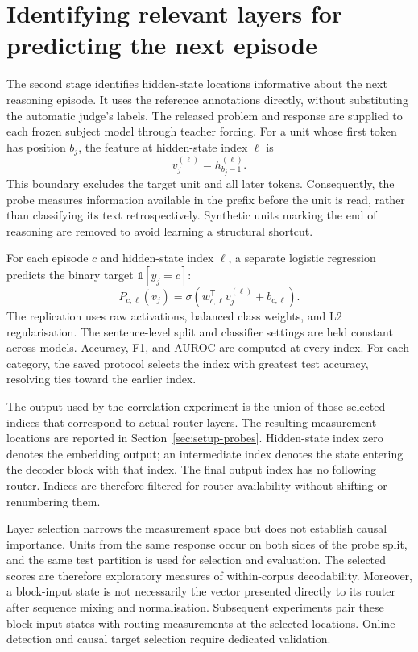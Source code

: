 \documentclass[12pt,a4paper,twoside,openright]{book}
\begin{document}
\section{Identifying relevant layers for predicting the next episode}
\label{sec:method-probes}

The second stage identifies hidden-state locations informative about the
next reasoning episode. It uses the reference annotations directly, without
substituting the automatic judge's labels. The released problem and response
are supplied to each frozen subject model through teacher forcing. For a
unit whose first token has position $b_j$, the feature at hidden-state index
$\ell$ is
\begin{equation}
  v_j^{(\ell)}=h_{b_j-1}^{(\ell)}.
\end{equation}
This boundary excludes the target unit and all later tokens. Consequently,
the probe measures information available in the prefix before the unit is
read, rather than classifying its text retrospectively. Synthetic units marking the end of reasoning are removed to avoid learning a structural shortcut.

For each episode $c$ and hidden-state index $\ell$, a separate logistic
regression predicts the binary target $\mathds{1}[y_j=c]$:
\begin{equation}
  P_{c,\ell}(v_j)=
  \sigma\!\left(w_{c,\ell}^{\mathsf T}v_j^{(\ell)}+b_{c,\ell}\right).
\end{equation}
The replication uses raw activations, balanced class weights, and L2
regularisation. The sentence-level split and classifier settings are held
constant across models. Accuracy, F1, and AUROC are computed at every index.
For each category, the saved protocol selects the index with greatest test
accuracy, resolving ties toward the earlier index.

The output used by the correlation experiment is the union of those selected
indices that correspond to actual router layers. The resulting measurement
locations are reported in Section~\ref{sec:setup-probes}.
Hidden-state index zero denotes
the embedding output; an intermediate index denotes the state entering the
decoder block with that index. The final output index has no following
router. Indices are therefore filtered for router availability without
shifting or renumbering them.

Layer selection narrows the measurement space but does not establish causal
importance. Units from the same response occur on both sides of the probe
split, and the same test partition is used for selection and evaluation. The
selected scores are therefore exploratory measures of within-corpus
decodability. Moreover, a block-input state is not necessarily the vector
presented directly to its router after sequence mixing and normalisation.
Subsequent experiments pair these block-input states with routing measurements
at the selected locations. Online detection and causal target selection
require dedicated validation.
\end{document}

